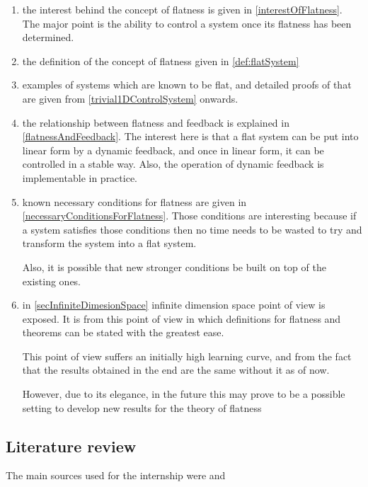 \documentclass[12pt]{article}
\begin{document}
\begin{enumerate}
  \item the interest behind the concept of flatness is given in \ref{interestOfFlatness}. The major point is the ability to control a system
  once its flatness has been determined.
  
  \item the definition of the concept of flatness given in \ref{def:flatSystem}

  \item examples of systems which are known to be flat, and detailed proofs of that
  are given from \ref{trivial1DControlSystem} onwards.
  
  \item the relationship between flatness and feedback is explained in \ref{flatnessAndFeedback}. The interest here is that a flat system can be put into linear form by a dynamic feedback, and once in linear form, it can be controlled in a stable way. Also, the operation of dynamic feedback is implementable in practice.
 
  \item known necessary conditions for flatness are given in \ref{necessaryConditionsForFlatness}. Those conditions are interesting because if a system satisfies those conditions then no time needs to be wasted to try and transform the system into a flat system.
  
  Also, it is possible that new stronger conditions be built on top of the existing ones.
  
\item in \ref{secInfiniteDimesionSpace} infinite dimension space point of view is
 exposed. It is from this point of view in which definitions for flatness and
 theorems can be stated with the greatest ease.
 
 This point of view suffers an initially high learning curve, and from the fact that
 the results obtained in the end are the same without it as of now.
 
 However, due to its elegance, in the future this may prove to be a possible setting
 to develop new results for the theory of flatness 
 
\end{enumerate}

\subsection{Literature review}

The main sources used for the internship were \cite{MR99} and \cite{Le09}
\end{document}
